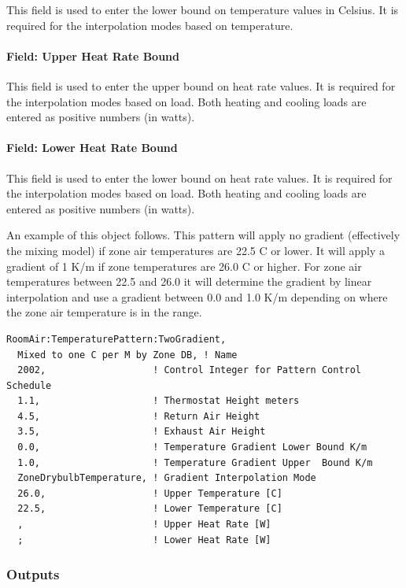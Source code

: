 This field is used to enter the lower bound on temperature values in Celsius. It is required for the interpolation modes based on temperature.

\paragraph{Field: Upper Heat Rate Bound}\label{field-upper-heat-rate-bound}

This field is used to enter the upper bound on heat rate values. It is required for the interpolation modes based on load. Both heating and cooling loads are entered as positive numbers (in watts).

\paragraph{Field: Lower Heat Rate Bound}\label{field-lower-heat-rate-bound}

This field is used to enter the lower bound on heat rate values. It is required for the interpolation modes based on load. Both heating and cooling loads are entered as positive numbers (in watts).

An example of this object follows. This pattern will apply no gradient (effectively the mixing model) if zone air temperatures are 22.5 C or lower. It will apply a gradient of 1 K/m if zone temperatures are 26.0 C or higher. For zone air temperatures between 22.5 and 26.0 it will determine the gradient by linear interpolation and use a gradient between 0.0 and 1.0 K/m depending on where the zone air temperature is in the range.

\begin{lstlisting}
RoomAir:TemperaturePattern:TwoGradient,
  Mixed to one C per M by Zone DB, ! Name
  2002,                   ! Control Integer for Pattern Control Schedule
  1.1,                    ! Thermostat Height meters
  4.5,                    ! Return Air Height
  3.5,                    ! Exhaust Air Height
  0.0,                    ! Temperature Gradient Lower Bound K/m
  1.0,                    ! Temperature Gradient Upper  Bound K/m
  ZoneDrybulbTemperature, ! Gradient Interpolation Mode
  26.0,                   ! Upper Temperature [C]
  22.5,                   ! Lower Temperature [C]
  ,                       ! Upper Heat Rate [W]
  ;                       ! Lower Heat Rate [W]
\end{lstlisting}

\subsubsection{Outputs}\label{roomairtemperaturepatterntwogradient-outputs}

